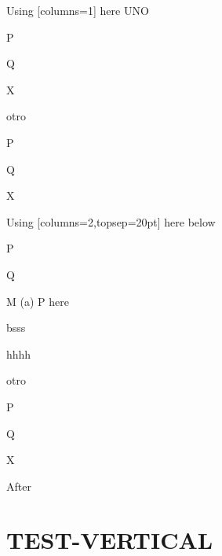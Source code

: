 \documentclass[12pt]{article}
\begin{document}
\begin{enumext}[columns=2,nosep]%
\item Using [columns=1] here UNO

\begin{enumext}[columns=1,nosep]%
     \item  P \item Q \item X  %
  \end{enumext}

\item otro

\begin{enumext}[columns=1,topsep=20pt,partopsep=20pt,nosep]%
     \item  P \item Q \item X  %
  \end{enumext}
\columnbreak

\item Using [columns=2,topsep=20pt] here below
  \begin{enumext}[columns=1,mini-env={0.4\linewidth},nosep]%
    \item  P \item Q \item M %
    \miniright
    (a) P here \par bsss \par hhhh
  \end{enumext}

\item otro

\begin{enumext}[columns=1,topsep=20pt,,partopsep=20pt,nosep]%
     \item  P \item Q \item X  %
  \end{enumext}
\end{enumext}
After
\stop

\section{TEST-VERTICAL}
\end{document}
